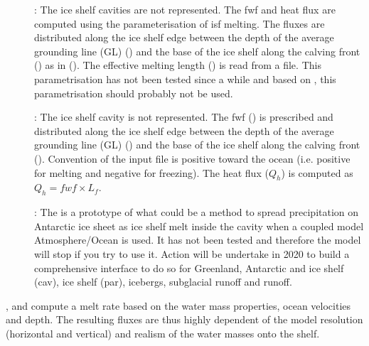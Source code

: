 \documentclass[../main/NEMO_manual]{subfiles}
\begin{document}
  \begin{description}

     \item[]:
     The ice shelf cavities are not represented.
     The fwf and heat flux are computed using the \citet{beckmann.goosse_OM03} parameterisation of isf melting.
     The fluxes are distributed along the ice shelf edge between the depth of the average grounding line (GL)
     () and the base of the ice shelf along the calving front
     () as in ().
     The effective melting length () is read from a file.
     This parametrisation has not been tested since a while and based on \citet{Favier2019}, 
     this parametrisation should probably not be used.

     \item[]:
     The ice shelf cavity is not represented.
     The fwf () is prescribed and distributed along the ice shelf edge between
     the depth of the average grounding line (GL) () and
     the base of the ice shelf along the calving front (). Convention of the input file is positive toward the ocean (i.e. positive for melting and negative for freezing).
     The heat flux ($Q_h$) is computed as $Q_h = fwf \times L_f$.

     \item[]:
     The  is a prototype of what could be a method to spread precipitation on Antarctic ice sheet as ice shelf melt inside the cavity when a coupled model Atmosphere/Ocean is used. 
     It has not been tested and therefore the model will stop if you try to use it. 
     Action will be undertake in 2020 to build a comprehensive interface to do so for Greenland, Antarctic and ice shelf (cav), ice shelf (par), icebergs, subglacial runoff and runoff.

  \end{description}

,  and  compute a melt rate based on
the water mass properties, ocean velocities and depth.
The resulting fluxes are thus highly dependent of the model resolution (horizontal and vertical) and 
realism of the water masses onto the shelf.\\
\end{document}
